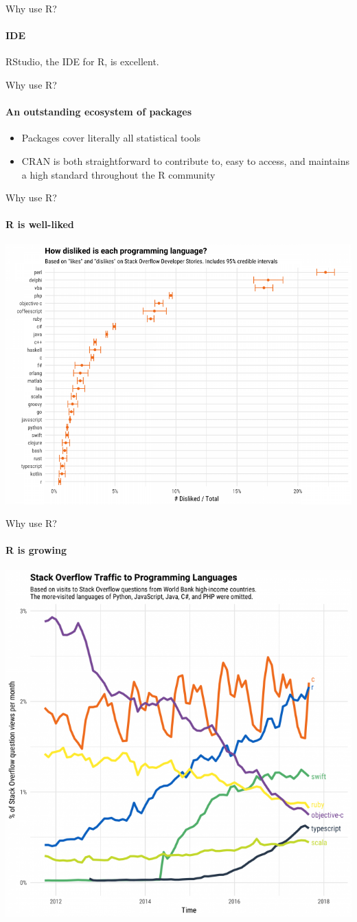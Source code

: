 \documentclass{grattan_pres}\usepackage[]{graphicx}\usepackage[]{color}
\begin{document}
\begin{frame}{Why use R?}
\framesubtitle{IDE}

RStudio, the IDE for R, is excellent.
\end{frame}

\begin{frame}{Why use R?}
\framesubtitle{An outstanding ecosystem of packages}
\begin{itemize}
\item Packages cover literally all statistical tools
\item CRAN is both straightforward to contribute to, easy to access, and maintains a high standard throughout the R community
\end{itemize}
\end{frame}

\begin{frame}{Why use R?}
\framesubtitle{R is well-liked}
\includegraphics[width=0.8\linewidth]{How-disliked-are-programming-languages-SO}
\end{frame}

\begin{frame}{Why use R?}
\framesubtitle{R is growing}
\includegraphics[width=0.7\linewidth]{Growth-of-R}
\end{frame}
\end{document}
